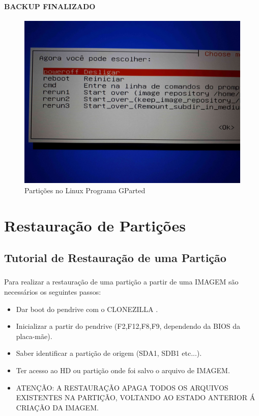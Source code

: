 \documentclass{beamer}
\begin{document}
\begin{frame}[plain,c]
   \frametitle{\insertsection}
    \framesubtitle{BACKUP FINALIZADO}
    \begin{figure}[!h]
        \includegraphics[width=1\linewidth]{images/backup/bkp32.jpg}
        \caption{Partições no Linux Programa GParted}
    \end{figure}
\end{frame}	

\section{Restauração de Partições}
\subsection{Tutorial de Restauração de uma Partição}
\begin{frame}
    \frametitle{\insertsection}
    \framesubtitle{\insertsubsection}
     \begin{block}{\insertsubsection}
  	\justifying
  Para realizar a restauração de uma partição a partir de uma IMAGEM são necessários os seguintes passos:
  
   \begin{itemize}[<+-| alert@+>]
        \item Dar boot do pendrive com o CLONEZILLA .
        \item Inicializar a partir do pendrive (F2,F12,F8,F9, dependendo da BIOS da placa-mãe).
        \item Saber identificar a partição de origem (SDA1, SDB1 etc...).
        \item Ter acesso ao HD ou partição onde foi salvo o arquivo de IMAGEM.
  		\item ATENÇÃO: A RESTAURAÇÃO APAGA TODOS OS ARQUIVOS EXISTENTES NA PARTIÇÃO, VOLTANDO AO ESTADO ANTERIOR Á CRIAÇÃO DA IMAGEM.
	  \end{itemize}
\end{block}
\end{frame}
\end{document}
